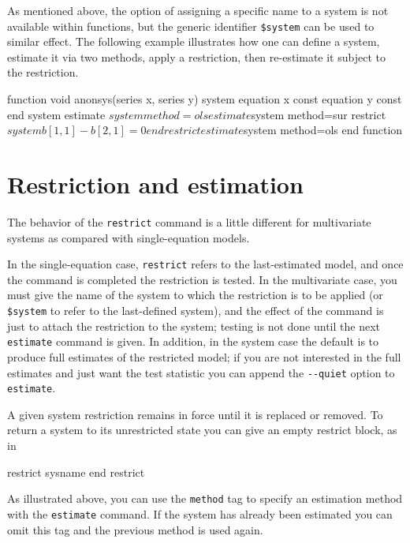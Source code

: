 As mentioned above, the option of assigning a specific name to a
system is not available within functions, but the generic identifier
\verb|$system| can be used to similar effect. The following example
illustrates how one can define a system, estimate it via two methods,
apply a restriction, then re-estimate it subject to the restriction.

\begin{code}
function void anonsys(series x, series y)
     system
         equation x const
         equation y const
     end system
     estimate $system method=ols
     estimate $system method=sur
     restrict $system
         b[1,1] - b[2,1] = 0
     end restrict
     estimate $system method=ols
end function
\end{code}

\section{Restriction and estimation}
\label{sec:sys-est}

The behavior of the \texttt{restrict} command is a little different
for multivariate systems as compared with single-equation models.

In the single-equation case, \texttt{restrict} refers to the
last-estimated model, and once the command is completed the
restriction is tested. In the multivariate case, you must give the
name of the system to which the restriction is to be applied (or
\verb|$system| to refer to the last-defined system), and the effect of
the command is just to attach the restriction to the system; testing
is not done until the next \texttt{estimate} command is given.  In
addition, in the system case the default is to produce full estimates
of the restricted model; if you are not interested in the full
estimates and just want the test statistic you can append the
\verb|--quiet| option to \texttt{estimate}.

A given system restriction remains in force until it is replaced or
removed. To return a system to its unrestricted state you can give
an empty restrict block, as in

\begin{code}
restrict sysname
end restrict
\end{code}

As illustrated above, you can use the \texttt{method} tag to specify
an estimation method with the \texttt{estimate} command. If the system
has already been estimated you can omit this tag and the previous
method is used again. 

